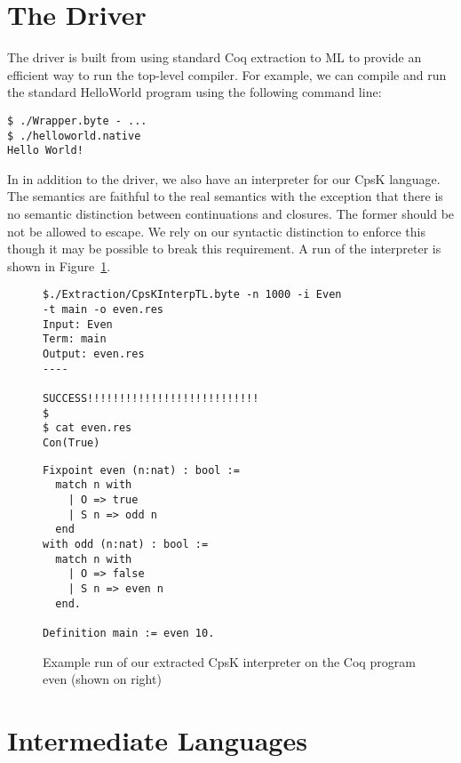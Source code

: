 \documentclass{article}
\begin{document}
\section{The Driver}
\label{sec:driver}

The driver is built from using standard Coq extraction to ML to provide an efficient way to run the top-level compiler. For example, we can compile and run the standard HelloWorld program using the following command line:

\begin{verbatim}
$ ./Wrapper.byte - ...
$ ./helloworld.native
Hello World!
\end{verbatim}

In in addition to the driver, we also have an interpreter for our CpsK language. The semantics are faithful to the real semantics with the exception that there is no semantic distinction between continuations and closures. The former should be not be allowed to escape. We rely on our syntactic distinction to enforce this though it may be possible to break this requirement. A run of the interpreter is shown in Figure~\ref{fig:interp}.

\begin{figure}
\centering
\vspace{10pt}
\begin{minipage}[t]{.55\textwidth}
\begin{verbatim}
$./Extraction/CpsKInterpTL.byte -n 1000 -i Even 
-t main -o even.res
Input: Even
Term: main
Output: even.res
----

SUCCESS!!!!!!!!!!!!!!!!!!!!!!!!!!!
$
$ cat even.res
Con(True)
\end{verbatim}
\end{minipage}
\begin{minipage}[t]{.3\textwidth}
\begin{lstlisting}
Fixpoint even (n:nat) : bool :=
  match n with
    | O => true
    | S n => odd n
  end
with odd (n:nat) : bool :=
  match n with
    | O => false
    | S n => even n
  end.

Definition main := even 10.
\end{lstlisting}
\end{minipage}
\caption{Example run of our extracted CpsK interpreter on the Coq program even (shown on right)}
\label{fig:interp}
\end{figure}

\section{Intermediate Languages}
\label{sec:il}
\end{document}
